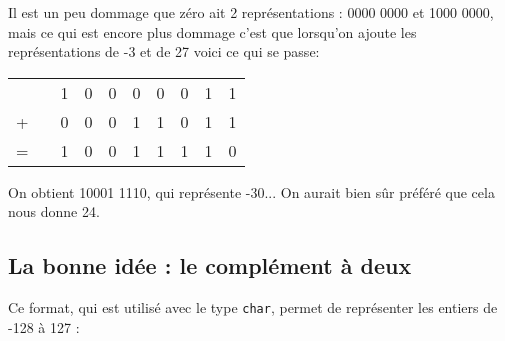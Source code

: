Il est un peu dommage que zéro ait 2 représentations : 0000 0000 et 1000 0000, mais ce qui est encore plus dommage
c'est que lorsqu'on ajoute les représentations de -3 et de 27 voici ce qui se passe:
\begin{center}

    \begin{tabular}{cccccccccc}
          &  & 1 & 0 & 0 & 0 & 0 & 0 & 1 & 1 \\

        + &  & 0 & 0 & 0 & 1 & 1 & 0 & 1 & 1 \\
        \hline
        = &  & 1 & 0 & 0 & 1 & 1 & 1 & 1 & 0 \\
    \end{tabular}

\end{center}

On obtient 10001 1110, qui représente -30... On aurait bien sûr préféré que cela nous donne 24.

\subsection{La bonne idée : le complément à deux}

Ce format, qui est utilisé avec le type \texttt{char}, permet de représenter les entiers de -128 à 127 :

